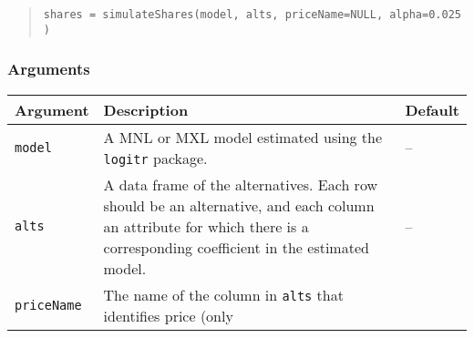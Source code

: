 \documentclass[article]{jss}
\begin{document}
\begin{quote}
\texttt{shares\ =\ simulateShares(model,\ alts,\ priceName=NULL,\ alpha=0.025)}
\end{quote}

\hypertarget{arguments-1}{%
\subsubsection{Arguments}\label{arguments-1}}

\begin{longtable}[]{@{}lll@{}}
\toprule
\begin{minipage}[b]{0.14\columnwidth}\raggedright
Argument\strut
\end{minipage} & \begin{minipage}[b]{0.66\columnwidth}\raggedright
Description\strut
\end{minipage} & \begin{minipage}[b]{0.11\columnwidth}\raggedright
Default\strut
\end{minipage}\tabularnewline
\midrule
\endhead
\begin{minipage}[t]{0.14\columnwidth}\raggedright
\texttt{model}\strut
\end{minipage} & \begin{minipage}[t]{0.66\columnwidth}\raggedright
A MNL or MXL model estimated using the \texttt{logitr} package.\strut
\end{minipage} & \begin{minipage}[t]{0.11\columnwidth}\raggedright
--\strut
\end{minipage}\tabularnewline
\begin{minipage}[t]{0.14\columnwidth}\raggedright
\texttt{alts}\strut
\end{minipage} & \begin{minipage}[t]{0.66\columnwidth}\raggedright
A data frame of the alternatives. Each row should be an alternative, and
each column an attribute for which there is a corresponding coefficient
in the estimated model.\strut
\end{minipage} & \begin{minipage}[t]{0.11\columnwidth}\raggedright
--\strut
\end{minipage}\tabularnewline
\begin{minipage}[t]{0.14\columnwidth}\raggedright
\texttt{priceName}\strut
\end{minipage} & \begin{minipage}[t]{0.66\columnwidth}\raggedright
The name of the column in \texttt{alts} that identifies price (only

\end{minipage}
\end{longtable}
\end{document}

